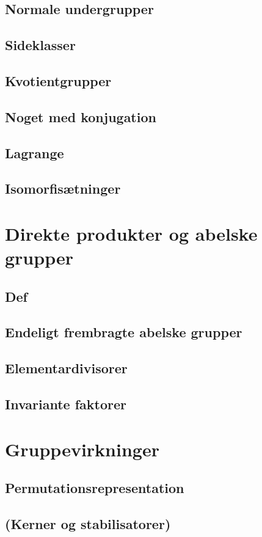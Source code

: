 \documentclass[11pt]{article}
\begin{document}
\subsection*{Normale undergrupper}
\subsection*{Sideklasser}
\subsection*{Kvotientgrupper}
\subsection*{Noget med konjugation}
\subsection*{Lagrange}
\subsection*{Isomorfisætninger}

\section*{Direkte produkter og abelske grupper}
\subsection*{Def}
\subsection*{Endeligt frembragte abelske grupper}
\subsection*{Elementardivisorer}
\subsection*{Invariante faktorer}

\section*{Gruppevirkninger}
\subsection*{Permutationsrepresentation}
\subsection*{(Kerner og stabilisatorer)}
\end{document}
